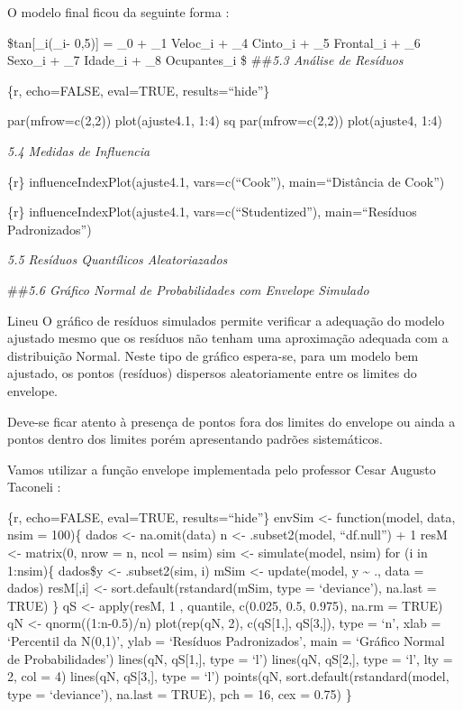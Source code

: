 \documentclass[]{article}
\begin{document}
O modelo final ficou da seguinte forma :

\$tan{[}\pi\_i(\mu\_i- 0,5){]} = \beta\_0 + \beta\_1 Veloc\_i + \beta\_4
Cinto\_i + \beta\_5 Frontal\_i + \beta\_6 Sexo\_i + \beta\_7 Idade\_i +
\beta\_8 Ocupantes\_i \$ \#\#\emph{5.3 Análise de Resíduos}

\{r, echo=FALSE, eval=TRUE, results=``hide''\}

par(mfrow=c(2,2)) plot(ajuste4.1, 1:4) sq par(mfrow=c(2,2))
plot(ajuste4, 1:4)

\emph{5.4 Medidas de Influencia}

\{r\} influenceIndexPlot(ajuste4.1, vars=c(``Cook''), main=``Distância
de Cook'')

\{r\} influenceIndexPlot(ajuste4.1, vars=c(``Studentized''),
main=``Resíduos Padronizados'')

\emph{5.5 Resíduos Quantílicos Aleatoriazados}

\#\#\emph{5.6 Gráfico Normal de Probabilidades com Envelope Simulado}

Lineu O gráfico de resíduos simulados permite verificar a adequação do
modelo ajustado mesmo que os resíduos não tenham uma aproximação
adequada com a distribuição Normal. Neste tipo de gráfico espera-se,
para um modelo bem ajustado, os pontos (resíduos) dispersos
aleatoriamente entre os limites do envelope.

Deve-se ficar atento à presença de pontos fora dos limites do envelope
ou ainda a pontos dentro dos limites porém apresentando padrões
sistemáticos.

Vamos utilizar a função envelope implementada pelo professor Cesar
Augusto Taconeli :

\{r, echo=FALSE, eval=TRUE, results=``hide''\} envSim \textless{}-
function(model, data, nsim = 100)\{ dados \textless{}- na.omit(data) n
\textless{}- .subset2(model, ``df.null'') + 1 resM \textless{}-
matrix(0, nrow = n, ncol = nsim) sim \textless{}- simulate(model, nsim)
for (i in 1:nsim)\{ dados\$y \textless{}- .subset2(sim, i) mSim
\textless{}- update(model, y \textasciitilde{} ., data = dados)
resM{[},i{]} \textless{}- sort.default(rstandard(mSim, type =
`deviance'), na.last = TRUE) \} qS \textless{}- apply(resM, 1 ,
quantile, c(0.025, 0.5, 0.975), na.rm = TRUE) qN \textless{}-
qnorm((1:n-0.5)/n) plot(rep(qN, 2), c(qS{[}1,{]}, qS{[}3,{]}), type =
`n', xlab = `Percentil da N(0,1)', ylab = `Resíduos Padronizados', main
= `Gráfico Normal de Probabilidades') lines(qN, qS{[}1,{]}, type = `l')
lines(qN, qS{[}2,{]}, type = `l', lty = 2, col = 4) lines(qN,
qS{[}3,{]}, type = `l') points(qN, sort.default(rstandard(model, type =
`deviance'), na.last = TRUE), pch = 16, cex = 0.75) \}
\end{document}
